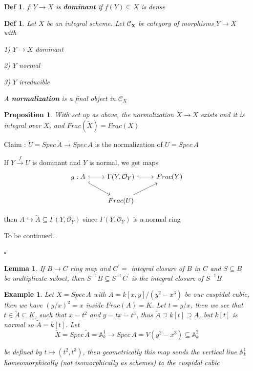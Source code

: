 \documentclass{article}
\newtheorem{definition}[theorem]{Def}
\newtheorem{lemma}[theorem]{Lemma}
\newtheorem{example}[theorem]{Example}
\newtheorem{proposition}[theorem]{Proposition}
\newenvironment{Proof}{{\noindent \indent \it Proof:\quad}}{\hfill $\square$\par}
\begin{document}
\begin{definition}
    $f:Y\to X$ is \textbf{dominant} if $f(Y)\subseteq X$ is dense
\end{definition}

\begin{definition}
    Let $X$ be an integral scheme. Let $\bm{\mathcal C_X}$ be category of morphisms $Y\to X$ with 
    
    1) $Y\to X$ dominant 
    
    2) $Y$ normal
    
    3) $Y$ irreducible
    
    A \textbf{normalization} is a final object in $\mathcal C_X$
\end{definition}

\begin{proposition}
    With set up as above, the normalization $\widetilde X \to X$ exists and it is integral over $X$, and $Frac(\widetilde X) = Frac(X)$
\end{proposition}
\begin{Proof}
Claim : $\widetilde U=Spec\,\widetilde A \to Spec\,A$ is the normalization of $U=Spec\,A$

If $Y\xrightarrow{f} U$ is dominant and $Y$ is normal, we get maps 
\[\begin{tikzcd}
	{g:A} & {\Gamma(Y,\mathcal O_Y)} & {Frac(Y)} \\
	& {Frac(U)}
	\arrow[from=2-2, to=1-3]
	\arrow[hook, from=1-1, to=2-2]
	\arrow[hook, from=1-1, to=1-2]
	\arrow[hook, from=1-2, to=1-3]
\end{tikzcd}\]

then $A \hookrightarrow \widetilde A\subseteq \Gamma(Y,\mathcal O_Y)$ since $\Gamma(Y,\mathcal O_Y)$ is a normal ring

To be continued...

\end{Proof}

\begin{lemma}
    If $B\to C$ ring map and $C^\prime =$ integral closure of $B$ in $C$ and $S\subseteq B$ be multiplicate subset, then $S^{-1}B\subseteq S^{-1}C^\prime$ is the integral closure of $S^{-1}B$
\end{lemma}

\begin{example}
    Let $X = Spec\, A$ with $A = k[x, y]/(y^2 - x^3)$ be our cuspidal cubic, then we have
$(y/x)^2 = x$ inside $Frac(A) = K$. Let $t = y/x$, then we see that $t \in \widetilde A \subseteq K$, such that $x = t^2$ and
$y = tx = t^3$, thus $\widetilde A \supseteq k[t] \supseteq A$, but $k[t]$ is normal so $\widetilde A = k[t]$. Let
$$
\widetilde X = Spec\, \widetilde A =\mathbb A^1_k \to Spec\, A = V (y^2 - x^3) \subseteq \mathbb A^2_k
$$

be defined by $t \mapsto (t^2, t^3)$, then geometrically this map sends the vertical line $\mathbb A^1_k$
homeomorphically
(not isomorphically as schemes) to the cuspidal cubic
\end{example}
\end{document}
